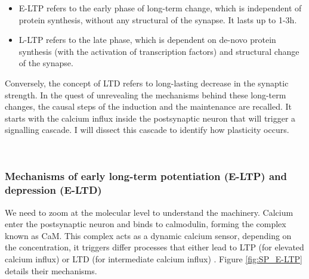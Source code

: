 \begin{itemize}
    \item \acrfull{E-LTP} refers to the early phase of long-term change, which is independent of protein synthesis, without any structural of the synapse. It lasts up to 1-3h.
    \item \acrfull{L-LTP} refers to the late phase, which is dependent on de-novo protein synthesis (with the activation of transcription factors) and structural change of the synapse.
\end{itemize}
Conversely, the concept of \acrfull{LTD} refers to long-lasting decrease in the synaptic strength. In the quest of unrevealing the mechanisms behind these long-term changes, the causal steps of the induction and the maintenance are recalled. It starts with the calcium influx inside the postsynaptic neuron that will trigger a signalling cascade. I will dissect this cascade to identify how plasticity occurs. 



\color{black}
~\\

\subsubsection{Mechanisms of early long-term potentiation (E-LTP) and depression (E-LTD)}
We need to zoom at the molecular level to understand the machinery.  Calcium enter the postsynaptic neuron and binds to calmodulin, forming the complex known as \acrfull{CaM}. This complex acts as a dynamic calcium sensor, depending on the concentration, it triggers differ processes that either lead to \acrfull{LTP} (for elevated calcium influx) or \acrfull{LTD} (for intermediate calcium influx) \citep{kotaleski_modelling_2010, feldman_spike-timing_2012, seibt_primed_2019}. Figure \ref{fig:SP_E-LTP} details their mechanisms. 

